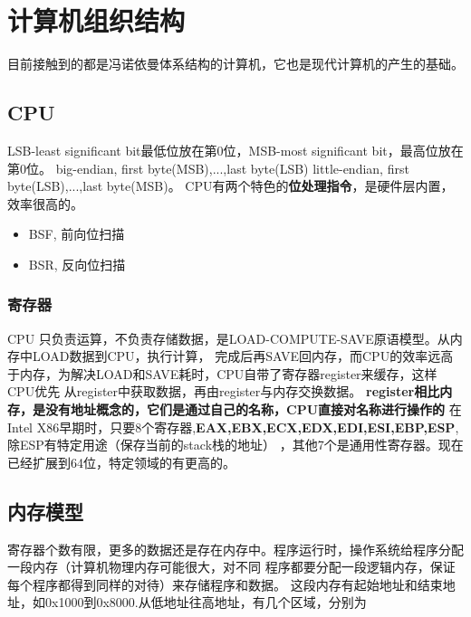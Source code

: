 \section{计算机组织结构}
目前接触到的都是冯诺依曼体系结构的计算机，它也是现代计算机的产生的基础。
\subsection{CPU}
LSB-least significant bit最低位放在第0位，MSB-most significant bit，最高位放在第0位。
\newline
big-endian, first byte(MSB),...,last byte(LSB)
\newline
little-endian, first byte(LSB),...,last byte(MSB)。
\newline
CPU有两个特色的\textbf{位处理指令}，是硬件层内置，效率很高的。
\begin{itemize}
    \item {BSF, 前向位扫描}
    \item {BSR, 反向位扫描}
\end{itemize}

\subsubsection{寄存器}
CPU 只负责运算，不负责存储数据，是LOAD-COMPUTE-SAVE原语模型。从内存中LOAD数据到CPU，执行计算，
完成后再SAVE回内存，而CPU的效率远高于内存，为解决LOAD和SAVE耗时，CPU自带了寄存器register来缓存，这样CPU优先
从register中获取数据，再由register与内存交换数据。
\newline
\textbf{register相比内存，是没有地址概念的，它们是通过自己的名称，CPU直接对名称进行操作的}
\newline
在Intel X86早期时，只要8个寄存器,\textbf{EAX,EBX,ECX,EDX,EDI,ESI,EBP,ESP},除ESP有特定用途（保存当前的stack栈的地址）
，其他7个是通用性寄存器。现在已经扩展到64位，特定领域的有更高的。 

\subsection{内存模型}
寄存器个数有限，更多的数据还是存在内存中。程序运行时，操作系统给程序分配一段内存（计算机物理内存可能很大，对不同
程序都要分配一段逻辑内存，保证每个程序都得到同样的对待）来存储程序和数据。
\newline
这段内存有起始地址和结束地址，如0x1000到0x8000.从低地址往高地址，有几个区域，分别为
